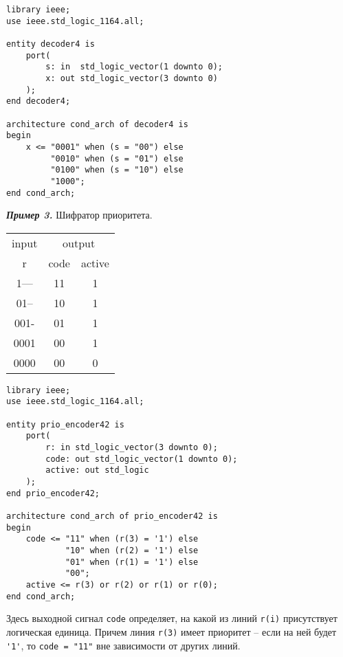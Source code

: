 \begin{lstlisting}
library ieee;
use ieee.std_logic_1164.all;

entity decoder4 is
    port(
        s: in  std_logic_vector(1 downto 0);
        x: out std_logic_vector(3 downto 0)
    );
end decoder4;

architecture cond_arch of decoder4 is
begin
    x <= "0001" when (s = "00") else
         "0010" when (s = "01") else
         "0100" when (s = "10") else
         "1000";
end cond_arch;
\end{lstlisting}

\textbf{\textit{Пример 3.}} Шифратор приоритета.
\begin{table}[h]
\centering
\begin{tabular}{|c|c|c|}
\hline
input & \multicolumn{2}{c}{output} \\
r     & code & active              \\ \hline
1---  & 11   & 1                   \\
01--  & 10   & 1                   \\
001-  & 01   & 1                   \\
0001  & 00   & 1                   \\
0000  & 00   & 0                   \\
\hline
\end{tabular}
\end{table}

\begin{lstlisting}
library ieee;
use ieee.std_logic_1164.all;

entity prio_encoder42 is
    port(
        r: in std_logic_vector(3 downto 0);
        code: out std_logic_vector(1 downto 0);
        active: out std_logic
    );
end prio_encoder42;

architecture cond_arch of prio_encoder42 is
begin
    code <= "11" when (r(3) = '1') else
            "10" when (r(2) = '1') else
            "01" when (r(1) = '1') else
            "00";
    active <= r(3) or r(2) or r(1) or r(0);
end cond_arch;
\end{lstlisting}

Здесь выходной сигнал \lstinline?code? определяет, на какой из линий \lstinline?r(i)? присутствует логическая единица. Причем линия \lstinline?r(3)? имеет приоритет – если на ней будет \lstinline?'1'?, то \lstinline?code = "11"? вне зависимости от других линий. 
